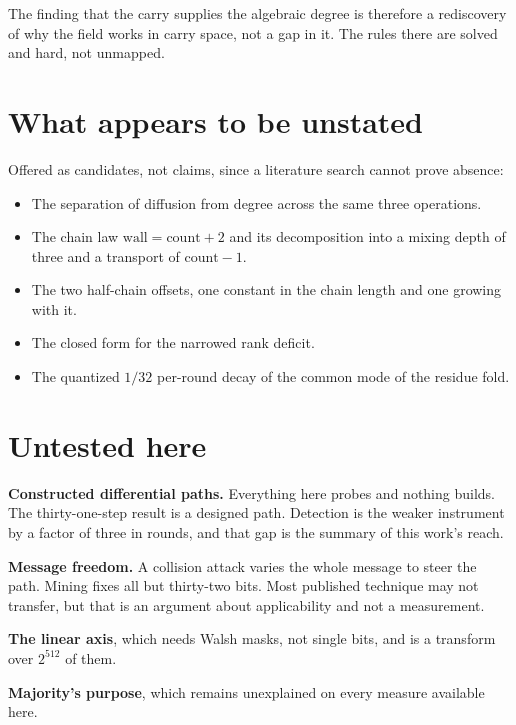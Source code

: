 The finding that the carry supplies the algebraic degree is therefore a rediscovery of why the field works in carry space, not a gap in it. The rules there are solved and hard, not unmapped.

\section{What appears to be unstated}

Offered as candidates, not claims, since a literature search cannot prove absence:

\begin{itemize}
  \item The separation of diffusion from degree across the same three operations.
  \item The chain law \(\mathrm{wall} = \mathrm{count} + 2\) and its decomposition into a mixing depth of three and a transport of \(\mathrm{count} - 1\).
  \item The two half-chain offsets, one constant in the chain length and one growing with it.
  \item The closed form for the narrowed rank deficit.
  \item The quantized \(1/32\) per-round decay of the common mode of the residue fold.
\end{itemize}

\section{Untested here}

\textbf{Constructed differential paths.} Everything here probes and nothing builds. The thirty-one-step result is a designed path. Detection is the weaker instrument by a factor of three in rounds, and that gap is the summary of this work's reach.

\textbf{Message freedom.} A collision attack varies the whole message to steer the path. Mining fixes all but thirty-two bits. Most published technique may not transfer, but that is an argument about applicability and not a measurement.

\textbf{The linear axis}, which needs Walsh masks, not single bits, and is a transform over \(2^{512}\) of them.

\textbf{Majority's purpose}, which remains unexplained on every measure available here.
